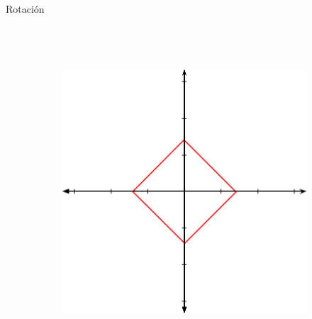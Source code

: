 \begin{frame}{Rotación}
\begin{columns}
\begin{figure}[htp]
\begin{subfigure}[b]{0.4\textwidth}
 \end{subfigure}
\\
\vspace{0.15cm}
 \begin{subfigure}[b]{0.4\textwidth}
   \includegraphics[width=\textwidth]{img/Rotated}
 \end{subfigure}
\end{figure}
\end{columns}
\end{frame}

